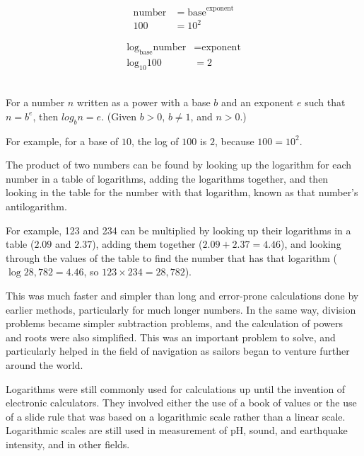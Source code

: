 \documentclass[12pt]{article}
\begin{document}
\begin{minipage}{0.45\textwidth}
    \begin{align*}
        \textrm{number} &= \textrm{base}^{\textrm{exponent}} \\
        100 &= 10^2 
    \end{align*}
\end{minipage}
\hfill
\begin{minipage}{0.45\textwidth}
    \begin{align*}
        \textrm{log}_{\textrm{base}} \textrm{number} &= \textrm{exponent} \\
        \textrm{log}_{10} 100 &= 2
    \end{align*}
\end{minipage}\\

For a number $n$ written as a power with a base $b$ and an exponent $e$ such that $n = b^e$, then $log_b n = e$. (Given $b>0$, $b\neq1$, and $n>0$.)

For example, for a base of $10$, the log of $100$ is $2$, because $100 = 10^2$.

The product of two numbers can be found by looking up the logarithm for each number in a table of logarithms, adding the logarithms together, and then looking in the table for the number with that logarithm, known as that number’s antilogarithm.

For example, 123 and 234 can be multiplied by looking up their logarithms in a table ($2.09$ and $2.37$), adding them together ($2.09+2.37=4.46$), and looking through the values of the table to find the number that has that logarithm ($\log {28,782}=4.46$, so $123 \times 234=28,782$).

This was much faster and simpler than long and error-prone calculations done by earlier methods, particularly for much longer numbers. In the same way, division problems became simpler subtraction problems, and the calculation of powers and roots were also simplified. This was an important problem to solve, and particularly helped in the field of navigation as sailors began to venture further around the world.

Logarithms were still commonly used for calculations up until the invention of electronic calculators. They involved either the use of a book of values or the use of a slide rule that was based on a logarithmic scale rather than a linear scale.  Logarithmic scales are still used in measurement of pH, sound, and earthquake intensity, and in other fields.
\end{document}
